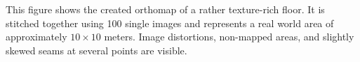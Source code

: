 \label{fig:orthomap}
This figure shows
    the created orthomap of a rather texture-rich floor. It is
    stitched together using 100 single images and represents a
    real world area of approximately $10\times10$ meters. Image
    distortions, non-mapped areas, and slightly skewed seams at
    several points are visible.%